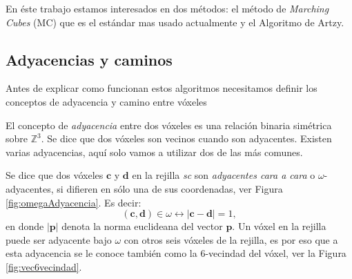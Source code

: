 En éste trabajo estamos interesados en dos métodos: el método de \emph{Marching Cubes} (MC)\cite{MarchingCubes} que es el estándar mas usado actualmente y el Algoritmo de Artzy\cite{artzyCorto}.

\subsection{Adyacencias y caminos}

Antes de explicar como funcionan estos algoritmos necesitamos definir los conceptos de adyacencia y camino entre vóxeles

El concepto de \emph{adyacencia} entre dos vóxeles es una relación binaria simétrica sobre $\mathbb{Z}^3$. Se dice que dos vóxeles son vecinos cuando son adyacentes. Existen varias adyacencias, aquí solo vamos a utilizar dos de las más comunes.

Se dice que dos vóxeles $\textbf{c}$ y $\textbf{d}$ en la rejilla \emph{sc} son \emph{adyacentes cara a cara} o $\omega$-adyacentes, si difieren en sólo una de sus coordenadas, ver Figura \ref{fig:omegaAdyacencia}. Es decir:
\begin{equation}
(\textbf{c}, \textbf{d}) \in \omega \leftrightarrow |\textbf{c} - \textbf{d} | = 1 
\label{ec:adja6},
\end{equation} en donde $|\textbf{p}|$ denota la norma euclideana del vector $\textbf{p}$. Un vóxel en la rejilla puede ser adyacente bajo $\omega$ con otros seis vóxeles de la rejilla, es por eso que a esta adyacencia se le conoce también como la $6$-vecindad del vóxel, ver la Figura \ref{fig:vec6vecindad}.





